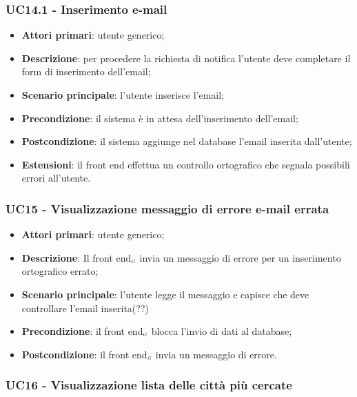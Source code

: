 \subsubsection{UC14.1 - Inserimento e-mail}\label{CasiDUsoCasiDUsoFacoltativiTraUnUtenteEIlFrontEndElencoCasiDUsoUC141InserimentoEmail}

\begin{itemize}
	\item \textbf{Attori primari}: utente generico;
	\item \textbf{Descrizione}: per procedere la richiesta di notifica l'utente deve completare il form di inserimento dell'email; 
	\item \textbf{Scenario principale}: l'utente inserisce l'email;
	\item \textbf{Precondizione}: il sistema è in attesa dell'inserimento dell'email;
	\item \textbf{Postcondizione}: il sistema aggiunge nel database l'email inserita dall'utente;
	\item \textbf{Estensioni}: il front end effettua un controllo ortografico che segnala possibili errori all'utente.
\end{itemize}

\subsubsection{UC15 - Visualizzazione messaggio di errore e-mail errata}\label{CasiDUsoCasiDUsoFacoltativiTraUnUtenteEIlFrontEndElencoCasiDUsoUC15VisualizzazioneMessaggioDiErroreEmailErrata}

\begin{itemize}
	\item \textbf{Attori primari}: utente generico;
	\item \textbf{Descrizione}: Il front end$_{\scaleto{G}{3pt}}$ invia un messaggio di errore per un inserimento ortografico errato;
	\item \textbf{Scenario principale}: l'utente legge il messaggio e capisce che deve controllare l'email inserita(??)
	\item \textbf{Precondizione}: il front end$_{\scaleto{G}{3pt}}$ blocca l'invio di dati al database;
	\item \textbf{Postcondizione}: il front end$_{\scaleto{G}{3pt}}$ invia un messaggio di errore.
\end{itemize}

\subsubsection{UC16 - Visualizzazione lista delle città più cercate}\label{CasiDUsoCasiDUsoFacoltativiTraUnUtenteEIlFrontEndElencoCasiDUsoUC16VisualizzazioneListaDelleCittaPiuCercate}

